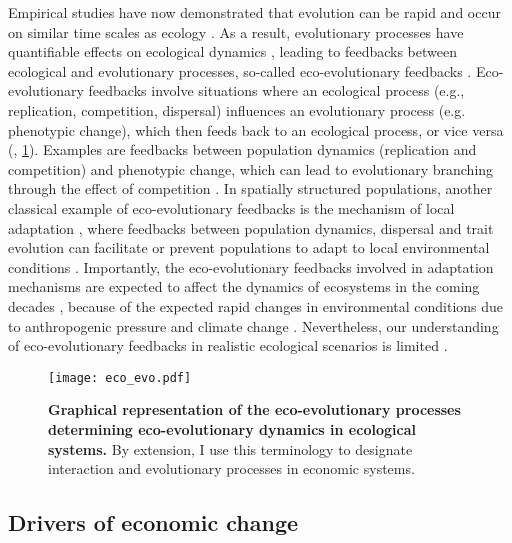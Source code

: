 Empirical studies have now demonstrated that evolution can be rapid and occur on similar time scales as ecology \citep{Hairston2005, Pelletier2009}. As a result, evolutionary processes have quantifiable effects on ecological dynamics \citep{Ezard2009}, leading to feedbacks between ecological and evolutionary processes, so-called eco-evolutionary feedbacks \citep{Pelletier2009,Schoener2011,Govaert2019}. 
% 
Eco-evolutionary feedbacks involve situations where an ecological process (e.g., replication, competition, dispersal) influences an evolutionary process (e.g. phenotypic change), which then feeds back to an ecological process, or vice versa (\cite{Govaert2019}, \cref{fig:eco_evo}). Examples are feedbacks between population dynamics (replication and competition) and phenotypic change, which can lead to evolutionary branching through the effect of competition \citep{Dieckmann1999}.
% 
In spatially structured populations, another classical example of eco-evolutionary feedbacks is the mechanism of local adaptation \citep{Savolainen2007}, where feedbacks between population dynamics, dispersal and trait evolution can facilitate or prevent populations to adapt to local environmental conditions \citep{Meszena1997,Doebeli2003}.
% 
Importantly, the eco-evolutionary feedbacks involved in adaptation mechanisms are expected to affect the dynamics of ecosystems in the coming decades \citep{Norberg2012,Urban2016}, because of the expected rapid changes in environmental conditions due to anthropogenic pressure and climate change \citep{Ellis2011,Midgley2019}.
% 
Nevertheless, our understanding of eco-evolutionary feedbacks in realistic ecological scenarios is limited \citep{Lion2022}.

\begin{figure}[ht]
    \centering
    \texttt{[image: eco\_evo.pdf]}
\caption{\textbf{Graphical representation of the eco-evolutionary processes determining eco-evolutionary dynamics in ecological systems.} By extension, I use this terminology to designate interaction and evolutionary processes in economic systems.}
\label{fig:eco_evo}
\end{figure}

\subsection{Drivers of economic change}


